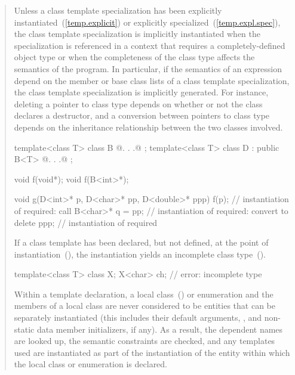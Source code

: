 \begin{quote}
\pnum
Unless a class template specialization has been explicitly
instantiated~(\ref{temp.explicit}) or explicitly
specialized~(\ref{temp.expl.spec}),
the class template specialization is implicitly instantiated when the
specialization is referenced in a context that requires a completely-defined
object type or when the completeness of the class type affects the semantics
of the program.
\enternote
In particular, if the semantics of an expression depend on the member or
base class lists of a class template specialization, the class template
specialization is implicitly generated. For instance, deleting a pointer
to class type depends on whether or not the class declares a destructor,
and a conversion between pointers to class type depends on the
inheritance relationship between the two classes involved.
\exitnote
\enterexample
\begin{codeblock}
template<class T> class B { @. . .@ };
template<class T> class D : public B<T> { @. . .@ };

void f(void*);
void f(B<int>*);

void g(D<int>* p, D<char>* pp, D<double>* ppp) {
  f(p);             // instantiation of  required: call 
  B<char>* q = pp;  // instantiation of  required: convert  to 
  delete ppp;       // instantiation of  required
}
\end{codeblock}
\exitexample
If a class template has been declared, but not defined,
at the point of instantiation~(),
the instantiation yields an incomplete class type~().
\enterexample
\begin{codeblock}
template<class T> class X;
X<char> ch;         // error: incomplete type 
\end{codeblock}
\exitexample
\enternote
Within a template declaration,
a local class~() or enumeration and the members of
a local class are never considered to be entities that can be separately
instantiated (this includes their default arguments, 
, and non-static data member
initializers, if any).
As a result, the dependent names are looked up, the
semantic constraints are checked, and any templates used are instantiated as
part of the instantiation of the entity within which the local class or
enumeration is declared.
\exitnote
\end{quote}


